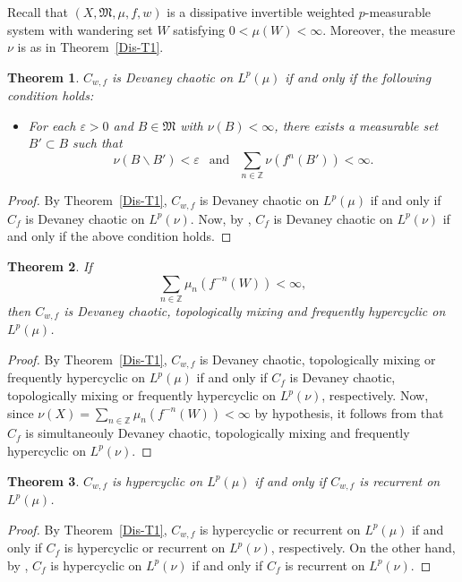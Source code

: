 \documentclass[12pt]{article}
\theoremstyle{plain}
\newtheorem{theorem}{Theorem}%
\theoremstyle{definition}
\newcommand{\Z}{\mathbb{Z}} %
\newcommand{\fM}{\mathfrak{M}}
\newcommand{\eps}{\varepsilon}
\begin{document}
\smallskip
Recall that $(X,\fM,\mu,f,w)$ is a dissipative invertible weighted $p$-measurable system
with wandering set $W$ satisfying $0 < \mu(W) < \infty$.
Moreover, the measure $\nu$ is as in Theorem~\ref{Dis-T1}.

\begin{theorem}\label{Dis-T2}
$C_{w,f}$ is Devaney chaotic on $L^p(\mu)$ if and only if the following condition holds:
\begin{itemize}
\item For each $\eps > 0$ and $B \in \fM$ with $\nu(B) < \infty$, there exists a measurable set $B' \subset B$ such that 
  \[
  \nu(B \backslash B') < \eps \ \ \text{ and } \ \ \sum _{n\in \Z} \nu (f^{n}(B')) < \infty.
  \]
\end{itemize}
\end{theorem}

\begin{proof}
By Theorem~\ref{Dis-T1}, $C_{w,f}$ is Devaney chaotic on $L^p(\mu)$ if and only if $C_{f}$ is Devaney chaotic on $L^p(\nu)$.
Now, by \cite[Corollary~3.5]{UDarBPir21}, $C_{f}$ is Devaney chaotic on $L^p(\nu)$ if and only if the above condition holds.
\end{proof}

\begin{theorem}\label{Dis-T3}
If 
\[
\sum _{n \in \Z} \mu_n(f^{-n}(W)) < \infty,
\]
then $C_{w,f}$ is Devaney chaotic, topologically mixing and frequently hypercyclic on $L^p(\mu)$.
\end{theorem}

\begin{proof}
By Theorem~\ref{Dis-T1}, $C_{w,f}$ is Devaney chaotic, topologically mixing or frequently hypercyclic on $L^p(\mu) $ if and only if 
$C_{f}$ is Devaney chaotic, topologically mixing or frequently hypercyclic on $L^p(\nu)$, respectively. 
Now, since $\nu(X) = \sum_{n \in \Z} \mu_n(f^{-n}(W)) < \infty$ by hypothesis, it follows from \cite[Theorem~3.3]{UDarBPir21} that
$C_{f}$ is simultaneouly Devaney chaotic, topologically mixing and frequently hypercyclic on $L^p(\nu)$.
\end{proof}

\begin{theorem}\label{Dis-T4}
$C_{w,f}$ is hypercyclic on $L^p(\mu)$ if and only if $C_{w,f}$ is recurrent on $L^p(\mu)$.
\end{theorem}

\begin{proof}
By Theorem~\ref{Dis-T1}, $C_{w,f}$ is hypercyclic or recurrent on $L^p(\mu)$ if and only if 
$C_{f}$ is hypercyclic or recurrent on $L^p(\nu)$, respectively. On the other hand, 
by \cite[Theorem 2.2]{AniMaiSeo24}, $C_{f}$ is hypercyclic on $L^p(\nu)$ if and only if $C_{f}$ is recurrent on $L^p(\nu)$.
\end{proof}
\end{document}
